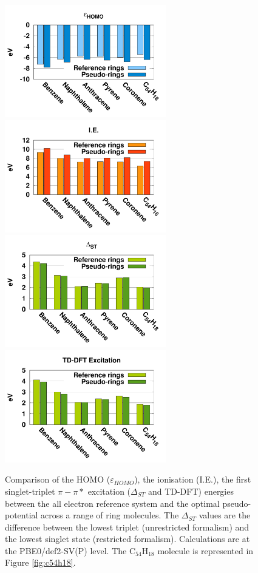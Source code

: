 \documentclass[aip,reprint]{revtex4-1}
\begin{document}
\begin{figure}
\begin{center}
\includegraphics[width=7cm]{ring_pbe0_homo}
\includegraphics[width=7cm]{ring_pbe0_ie}
\includegraphics[width=7cm]{ring_pbe0_st}
\includegraphics[width=7cm]{ring_pbe0_tddft}
\end{center}

\caption{Comparison of the HOMO ($\varepsilon_{HOMO}$),
the ionisation (I.E.),
the first singlet-triplet $\pi-\pi*$ excitation ($\Delta_{ST}$ and TD-DFT) energies
between the
all electron reference system and the optimal pseudo-potential across a range of ring molecules.
The $\Delta_{ST}$ values are the difference
between the lowest triplet (unrestricted formalism) and the lowest singlet state
(restricted formalism).
Calculations are at the PBE0/def2-SV(P) level.
The C\(_{54}\)H\(_{18}\) molecule is represented in Figure \ref{fig:c54h18}.}
\label{fig:rings_graphs}
\end{figure}
\end{document}
